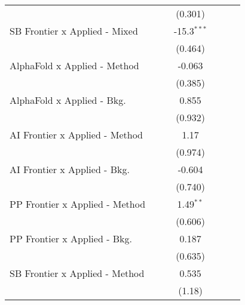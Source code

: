 \begin{tabular}{lcccccc}
                                  &               &              & (0.301)       &               &        &   \\   
   SB Frontier x Applied - Mixed  &               &              & -15.3$^{***}$ &               &        &   \\   
                                  &               &              & (0.464)       &               &        &   \\   
   AlphaFold x Applied - Method   &               &              & -0.063        &               &        &   \\   
                                  &               &              & (0.385)       &               &        &   \\   
   AlphaFold x Applied - Bkg.     &               &              & 0.855         &               &        &   \\   
                                  &               &              & (0.932)       &               &        &   \\   
   AI Frontier x Applied - Method &               &              & 1.17          &               &        &   \\   
                                  &               &              & (0.974)       &               &        &   \\   
   AI Frontier x Applied - Bkg.   &               &              & -0.604        &               &        &   \\   
                                  &               &              & (0.740)       &               &        &   \\   
   PP Frontier x Applied - Method &               &              & 1.49$^{**}$   &               &        &   \\   
                                  &               &              & (0.606)       &               &        &   \\   
   PP Frontier x Applied - Bkg.   &               &              & 0.187         &               &        &   \\   
                                  &               &              & (0.635)       &               &        &   \\   
   SB Frontier x Applied - Method &               &              & 0.535         &               &        &   \\   
                                  &               &              & (1.18)        &               &        &   \\   

\end{tabular}
